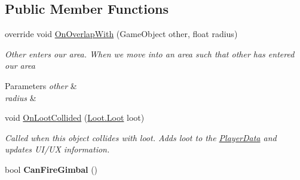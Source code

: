 \subsection*{Public Member Functions}
\begin{DoxyCompactItemize}
\item 
\hypertarget{class_skyrates_1_1_entity_1_1_entity_player_ship_ad4bfa608f86d94a38367b75f9fc32f21}{override void \hyperlink{class_skyrates_1_1_entity_1_1_entity_player_ship_ad4bfa608f86d94a38367b75f9fc32f21}{On\-Overlap\-With} (Game\-Object other, float radius)}\label{class_skyrates_1_1_entity_1_1_entity_player_ship_ad4bfa608f86d94a38367b75f9fc32f21}

\begin{DoxyCompactList}\small\item\em Other enters our area. When we move into an area such that other has entered our area 


\begin{DoxyParams}{Parameters}
{\em other} & \\
\hline
{\em radius} & \\
\hline
\end{DoxyParams}
 \end{DoxyCompactList}\item 
void \hyperlink{class_skyrates_1_1_entity_1_1_entity_player_ship_ac0928986c7d12c7c18bc3252d48eb15d}{On\-Loot\-Collided} (\hyperlink{class_skyrates_1_1_loot_1_1_loot}{Loot.\-Loot} loot)
\begin{DoxyCompactList}\small\item\em Called when this object collides with loot. Adds loot to the \hyperlink{class_skyrates_1_1_entity_1_1_entity_player_ship_a9dff4c7af9e4872a6bd58b821d12d3df}{Player\-Data} and updates U\-I/\-U\-X information. \end{DoxyCompactList}\item 
\hypertarget{class_skyrates_1_1_entity_1_1_entity_player_ship_aa6f4e6408737a3b4952f47e42f6459fb}{bool {\bfseries Can\-Fire\-Gimbal} ()}\label{class_skyrates_1_1_entity_1_1_entity_player_ship_aa6f4e6408737a3b4952f47e42f6459fb}

\end{DoxyCompactItemize}
